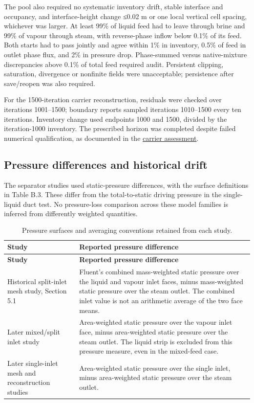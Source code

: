 The pool also required no systematic inventory drift, stable interface and occupancy, and interface-height change ≤0.02 m or one local vertical cell spacing, whichever was larger. At least 99\% of liquid feed had to leave through brine and 99\% of vapour through steam, with reverse-phase inflow below 0.1\% of its feed. Both starts had to pass jointly and agree within 1\% in inventory, 0.5\% of feed in outlet phase flux, and 2\% in pressure drop. Phase-summed versus native-mixture discrepancies above 0.1\% of total feed required audit. Persistent clipping, saturation, divergence or nonfinite fields were unacceptable; persistence after save/reopen was also required.

For the 1500-iteration carrier reconstruction, residuals were checked over iterations 1001--1500; boundary reports sampled iterations 1010--1500 every ten iterations. Inventory change used endpoints 1000 and 1500, divided by the iteration-1000 inventory. The prescribed horizon was completed despite failed numerical qualification, as documented in the \href{../../../../experiments/phase-10-single-inlet-mesh-convergence/replication1600-carrier-results.md}{carrier assessment}.

\subsection{Pressure differences and historical drift}

The separator studies used static-pressure differences, with the surface definitions in Table B.3. These differ from the total-to-static driving pressure in the single-liquid duct test. No pressure-loss comparison across these model families is inferred from differently weighted quantities.

\begin{longtable}{@{}>{\raggedright\arraybackslash}p{0.29000000\dimexpr\linewidth-2\tabcolsep\relax}>{\raggedright\arraybackslash}p{0.71000000\dimexpr\linewidth-2\tabcolsep\relax}@{}}
\caption{Pressure surfaces and averaging conventions retained from each study.}\label{tab:table-B.3}\\
\toprule
\textbf{Study} & \textbf{Reported pressure difference} \\
\midrule
\endfirsthead
\toprule
\textbf{Study} & \textbf{Reported pressure difference} \\
\midrule
\endhead
Historical split-inlet mesh study, Section 5.1 & Fluent's combined mass-weighted static pressure over the liquid and vapour inlet faces, minus mass-weighted static pressure over the steam outlet. The combined inlet value is not an arithmetic average of the two face means. \\
Later mixed/split inlet study & Area-weighted static pressure over the vapour inlet face, minus area-weighted static pressure over the steam outlet. The liquid strip is excluded from this pressure measure, even in the mixed-feed case. \\
Later single-inlet mesh and reconstruction studies & Area-weighted static pressure over the single inlet, minus area-weighted static pressure over the steam outlet. \\
\bottomrule
\end{longtable}


